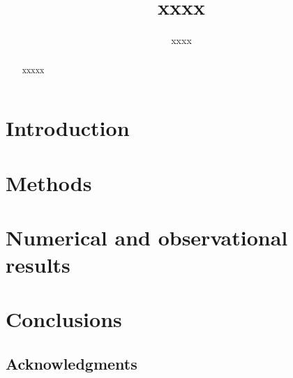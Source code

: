 \documentclass[11pt]{article}
\title{xxxx}
\author{xxxx}
\date{}
\begin{document}
\maketitle

\begin{abstract}
xxxxx
\end{abstract}

\section{Introduction}
\label{intro}

\section{Methods}
\label{sec:methods}

\section{Numerical and observational results}
\label{sec:results}

\section{Conclusions}

\subsection*{Acknowledgments}

\clearpage \newpage
 
\end{document}
